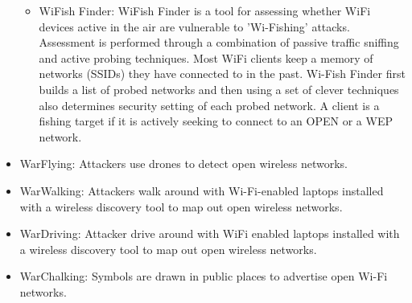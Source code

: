 \begin{itemize}
\begin{itemize}
        \item  WiFish Finder: WiFish Finder is a tool for assessing whether WiFi devices active in the air are vulnerable to 'Wi-Fishing' attacks. Assessment is performed through a combination of passive traffic sniffing and active probing techniques. Most WiFi clients keep a memory of networks (SSIDs) they have connected to in the past. Wi-Fish Finder first builds a list of probed networks and then using a set of clever techniques also determines security setting of each probed network. A client is a fishing target if it is actively seeking to connect to an OPEN or a WEP network.
    \end{itemize}
    \item WarFlying: Attackers use drones to detect open wireless networks.
    \item WarWalking: Attackers walk around with Wi-Fi-enabled laptops installed with a wireless discovery tool to map out open wireless networks.
    \item WarDriving: Attacker drive around with WiFi enabled laptops installed with a wireless discovery tool to map out open wireless networks.
    \item WarChalking: Symbols are drawn in public places to advertise open Wi-Fi networks.
\end{itemize}
